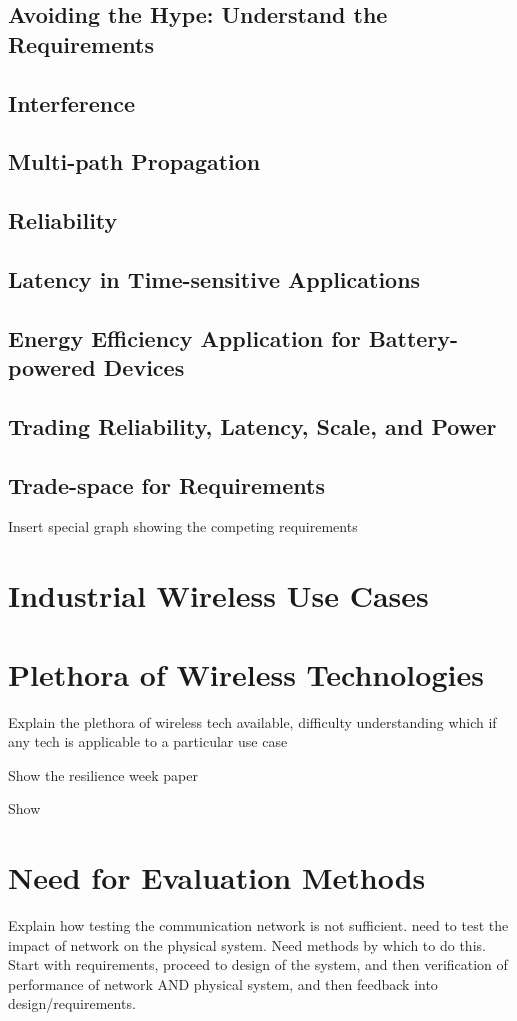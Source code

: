 \documentclass[english]{spimubphdthesis}
\begin{document}
\subsection{Avoiding the Hype: Understand the Requirements}
\subsection{Interference}
\subsection{Multi-path Propagation}
\subsection{Reliability}
\subsection{Latency in Time-sensitive Applications}
\subsection{Energy Efficiency Application for Battery-powered Devices }
\subsection{Trading Reliability, Latency, Scale, and Power}

\subsection{Trade-space for Requirements}
Insert special graph showing the competing requirements

\section{Industrial Wireless Use Cases}

\section{Plethora of Wireless Technologies}
Explain the plethora of wireless tech available, difficulty understanding which if any tech is applicable to a particular use case

Show the resilience week paper

Show 

\section{Need for Evaluation Methods }
Explain how testing the communication network is not sufficient.  need to test the impact of network on the physical system.  Need methods by which to do this.  Start with requirements, proceed to design of the system, and then verification of performance of network AND physical system, and then feedback into design/requirements.
\end{document}
